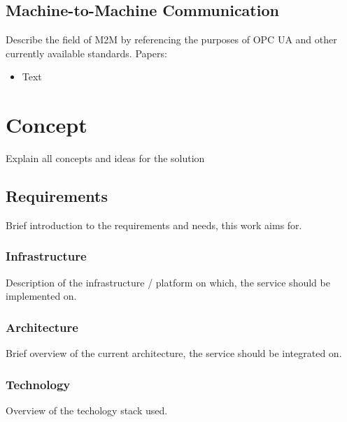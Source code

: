 \documentclass[
a4paper,
twoside,
bibliography=totoc,
headsepline,
cleardoublepage=empty,
parskip=half,
draft=false
]{scrbook}
\begin{document}
		\section{Machine-to-Machine Communication}\label{sec:machine_to_machine_communication}
		
			Describe the field of M2M by referencing the purposes of OPC UA and other currently available standards. Papers:
			
			\begin{itemize}
				
				\item Text
				
			\end{itemize}
				
	\chapter{Concept} \label{ch:concept}
	
		Explain all concepts and ideas for the solution
		
		\section{Requirements} \label{sec:requirements}
		
			Brief introduction to the requirements and needs, this work aims for.
		
			\subsection{Infrastructure} \label{subsec:infrastructure}
			
				Description of the infrastructure / platform on which, the service should be implemented on.
			
			\subsection{Architecture} \label{subsec:architecture}
			
				Brief overview of the current architecture, the service should be integrated on.
			
			\subsection{Technology} \label{subsec:technology}
			
				Overview of the techology stack used.
			
				
\end{document}
